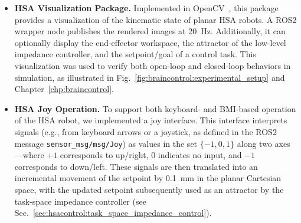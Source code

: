 \begin{itemize}
    \item \textbf{HSA Visualization Package.} Implemented in OpenCV~\citep{bradski2000opencv}, this package provides a visualization of the kinematic state of planar \gls{HSA} robots. A ROS2 wrapper node publishes the rendered images at \SI{20}{Hz}. Additionally, it can optionally display the end-effector workspace, the attractor of the low-level impedance controller, and the setpoint/goal of a control task. This visualization was used to verify both open-loop and closed-loop behaviors in simulation, as illustrated in Fig.~\ref{fig:braincontrol:experimental_setup} and Chapter~\ref{chp:braincontrol}.
    \item \textbf{HSA Joy Operation.} To support both keyboard- and \gls{BMI}-based operation of the \gls{HSA} robot, we implemented a joy interface. This interface interprets signals (e.g., from keyboard arrows or a joystick, as defined in the ROS2 message \texttt{sensor\_msg/msg/Joy}) as values in the set $\{-1, 0, 1\}$ along two axes—where $+1$ corresponds to up/right, $0$ indicates no input, and $-1$ corresponds to down/left. These signals are then translated into an incremental movement of the setpoint by \SI{0.1}{mm} in the planar Cartesian space, with the updated setpoint subsequently used as an attractor by the task-space impedance controller (see Sec.~\ref{sec:hsacontrol:task_space_impedance_control}).

\end{itemize}
